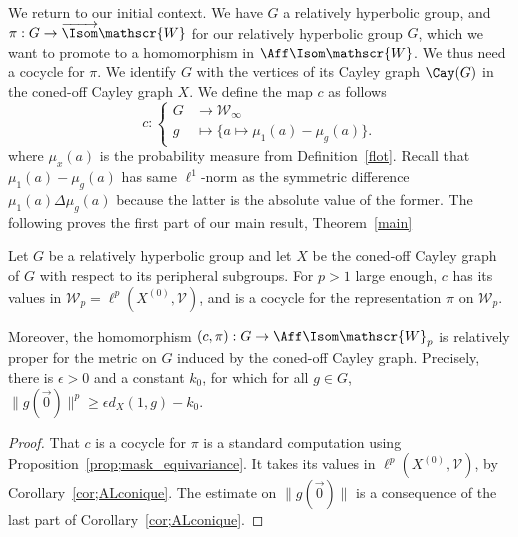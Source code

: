 We return to our initial context. We have $G$ a relatively hyperbolic group, and $\pi: G\to \overrightarrow{{\Isom}} {\mathscr{W}} $ for our relatively hyperbolic group $G$, which we want to promote to a homomorphism in ${\Aff}{\Isom} {\mathscr{W}} $. We thus need a cocycle for $\pi$. We identify $G$ with the vertices of its Cayley graph $\Cay (G)$ in the coned-off Cayley graph $X$. We define the map $c$ as follows
\[
c: \left\{
\begin{aligned} G &\to \mathscr{W}_{\infty}
\\ g & \mapsto \{a \mapsto
\mu_1(a) -
\mu_g(a)
\}.
\end{aligned} \right.
\]
where $\mu_x(a)$ is the probability measure from Definition~\ref{flot}. Recall that $\mu_1(a) - \mu_g(a)$ has same $\ell^1$-norm as the symmetric difference $\mu_1(a) \Delta\mu_{g}(a)$ because the latter is the absolute value of the former. The following proves the first part of our main result, Theorem~\ref{main}

\begin{theo}\label{thm;actionAL}
Let $G$ be a relatively hyperbolic group and let $X$ be the coned-off Cayley graph of $G$ with respect to its peripheral subgroups. For $p>1$ large enough, $c$ has its values in $\mathscr{W}_p=\ell^p(X^{(0)},\mathscr{V})$, and is a cocycle for the representation $\pi$ on $\mathscr{W}_p$.

Moreover, the homomorphism $(c,\pi): G \to {\Aff}{\Isom} {\mathscr{W}}_p$ is relatively proper for the metric on $G$ induced by the coned-off Cayley graph. Precisely, there is $\epsilon >0$ and a constant $k_0$, for which for all $g\in G$, $\|g(\vec{0})\|^p
\geq \epsilon d_X(1,g) -k_0$.
\end{theo}

\begin{proof}
That $c$ is a cocycle for $\pi$ is a standard computation using Proposition~\ref{prop;mask_equivariance}. It takes its values in $\ell^p(X^{(0)},\mathscr{V})$, by Corollary~\ref{cor;ALconique}. The estimate on $\|g(\vec{0})\|$ is a consequence of the last part of Corollary~\ref{cor;ALconique}.
\end{proof}
